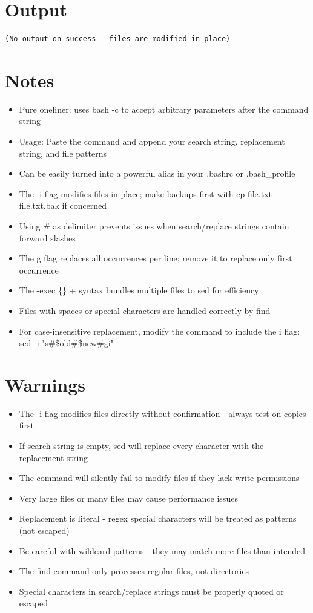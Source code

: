 \documentclass[openany]{book}
\begin{document}
\section*{Output}
\begin{lstlisting}
(No output on success - files are modified in place)
\end{lstlisting}

\section*{Notes}
\begin{itemize}
  \item Pure oneliner: uses bash -c to accept arbitrary parameters after the command string
  \item Usage: Paste the command and append your search string, replacement string, and file patterns
  \item Can be easily turned into a powerful alias in your .bashrc or .bash\_profile
  \item The -i flag modifies files in place; make backups first with cp file.txt file.txt.bak if concerned
  \item Using \# as delimiter prevents issues when search/replace strings contain forward slashes
  \item The g flag replaces all occurrences per line; remove it to replace only first occurrence
  \item The -exec \{\} + syntax bundles multiple files to sed for efficiency
  \item Files with spaces or special characters are handled correctly by find
  \item For case-insensitive replacement, modify the command to include the i flag: sed -i "s\#\$old\#\$new\#gi"
\end{itemize}

\section*{Warnings}
\begin{itemize}
  \item The -i flag modifies files directly without confirmation - always test on copies first
  \item If search string is empty, sed will replace every character with the replacement string
  \item The command will silently fail to modify files if they lack write permissions
  \item Very large files or many files may cause performance issues
  \item Replacement is literal - regex special characters will be treated as patterns (not escaped)
  \item Be careful with wildcard patterns - they may match more files than intended
  \item The find command only processes regular files, not directories
  \item Special characters in search/replace strings must be properly quoted or escaped
\end{itemize}
\end{document}

